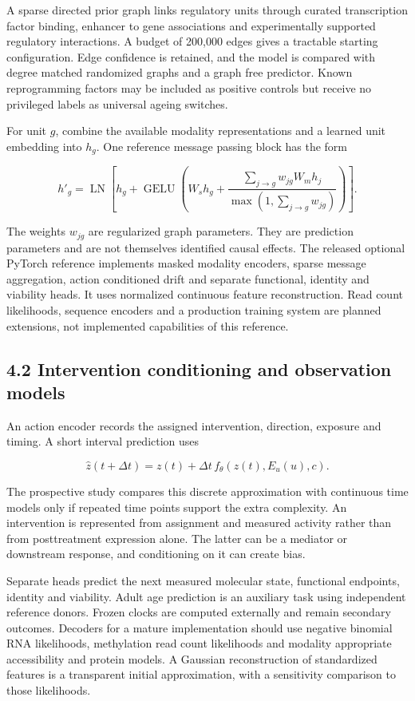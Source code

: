 \documentclass[
  11pt,
  letterpaper,
]{article}
\begin{document}
A sparse directed prior graph links regulatory units through curated
transcription factor binding, enhancer to gene associations and
experimentally supported regulatory interactions. A budget of 200,000
edges gives a tractable starting configuration. Edge confidence is
retained, and the model is compared with degree matched randomized
graphs and a graph free predictor. Known reprogramming factors may be
included as positive controls but receive no privileged labels as
universal ageing switches.

For unit \(g\), combine the available modality representations and a
learned unit embedding into \(h_g\). One reference message passing block
has the form

\[
h'_g=\operatorname{LN}\left[h_g+
\operatorname{GELU}\left(W_s h_g+
\frac{\sum_{j\rightarrow g}w_{jg}W_mh_j}{\max(1,\sum_{j\rightarrow g}w_{jg})}\right)\right].
\]

The weights \(w_{jg}\) are regularized graph parameters. They are
prediction parameters and are not themselves identified causal effects.
The released optional PyTorch reference implements masked modality
encoders, sparse message aggregation, action conditioned drift and
separate functional, identity and viability heads. It uses normalized
continuous feature reconstruction. Read count likelihoods, sequence
encoders and a production training system are planned extensions, not
implemented capabilities of this reference.

\hypertarget{intervention-conditioning-and-observation-models}{%
\subsection{4.2 Intervention conditioning and observation
models}\label{intervention-conditioning-and-observation-models}}

An action encoder records the assigned intervention, direction, exposure
and timing. A short interval prediction uses

\[
\widehat z(t+\Delta t)=z(t)+\Delta t\,
f_\theta(z(t),E_u(u),c).
\]

The prospective study compares this discrete approximation with
continuous time models only if repeated time points support the extra
complexity. An intervention is represented from assignment and measured
activity rather than from posttreatment expression alone. The latter can
be a mediator or downstream response, and conditioning on it can create
bias.

Separate heads predict the next measured molecular state, functional
endpoints, identity and viability. Adult age prediction is an auxiliary
task using independent reference donors. Frozen clocks are computed
externally and remain secondary outcomes. Decoders for a mature
implementation should use negative binomial RNA likelihoods, methylation
read count likelihoods and modality appropriate accessibility and
protein models. A Gaussian reconstruction of standardized features is a
transparent initial approximation, with a sensitivity comparison to
those likelihoods.
\end{document}
